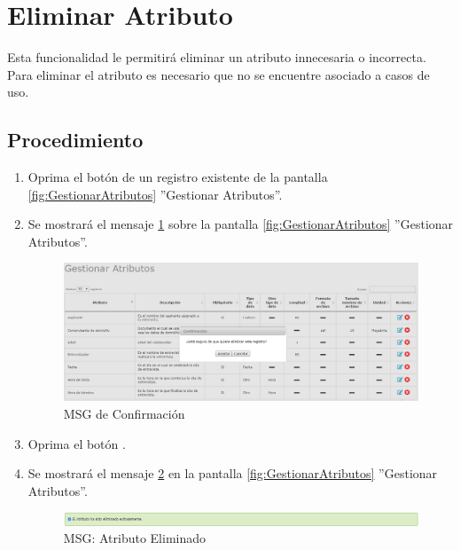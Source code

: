 \hypertarget{cv:eliminarAtributo}{\section{Eliminar Atributo}} \label{sec:eliminarAtributo}

	Esta funcionalidad le permitirá eliminar un atributo innecesaria o incorrecta. Para eliminar el atributo es necesario que no se encuentre asociado a casos de uso.
		\subsection{Procedimiento}

			\begin{enumerate}
	
			\item Oprima el botón \IUBotonEliminar{} de un registro existente de la pantalla \ref{fig:GestionarAtributos} ''Gestionar Atributos''.
	
			\item Se mostrará el mensaje \ref{fig:confirmaEliminaAtributo} sobre la pantalla \ref{fig:GestionarAtributos} ''Gestionar Atributos''.
			
			\begin{figure}[htbp!]
				\begin{center}
					\includegraphics[scale=0.5]{roles/lider/entidades/atributos/pantallas/IU12-1-3MSG10}
					\caption{MSG de Confirmación}
					\label{fig:confirmaEliminaAtributo}
				\end{center}
			\end{figure}
						
			\item Oprima el botón \IUAceptar.
			
			\item Se mostrará el mensaje \ref{fig:atributoEliminado} en la pantalla \ref{fig:GestionarAtributos} ''Gestionar Atributos''.
			
			\begin{figure}[htbp!]
				\begin{center}
					\includegraphics[scale=0.5]{roles/lider/entidades/atributos/pantallas/IU12-1-3MSG1}
					\caption{MSG: Atributo Eliminado}
					\label{fig:atributoEliminado}
				\end{center}
			\end{figure}
			\end{enumerate}